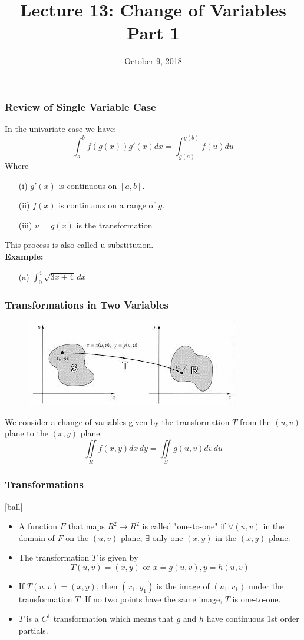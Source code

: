 \documentclass{beamer}
\title{Lecture 13: Change of Variables Part 1}
\date{October 9, 2018}
\begin{document}
	
\frame{\titlepage}


\begin{frame}
\frametitle{Review of Single Variable Case}
In the univariate case we have:
$$\int_a^b f(g(x))g'(x)dx = \int_{g(a)}^{g(b)} f(u) du$$
Where
\begin{itemize}
	\item[(i)] $g'(x)$ is continuous on $[a,b]$.
	\item[(ii)] $f(x)$ is continuous on a range of $g$.
	\item[(iii)] $u=g(x)$ is the transformation
\end{itemize}
This process is also called u-substitution.\\
\vspace{12pt}
\textbf{Example:}
\begin{itemize}
	\item[(a)] $\int_0^4 \sqrt{3x+4} \, dx$
\end{itemize}
\end{frame}

\begin{frame}
\frametitle{Transformations in Two Variables}
\begin{figure}
	
	\includegraphics[width=.9\textheight]{vmap.jpg}\\
	\hspace*{10pt}\hbox{}
\end{figure}
We consider a change of variables given by the transformation $T$ from the $(u,v)$ plane to the $(x,y)$ plane.
$$\iint\limits_R f(x,y) dx\,dy = \iint\limits_S g(u,v)dv\,du$$
\end{frame}


\begin{frame}
\frametitle{Transformations}
[ball]
\begin{itemize}
	\item A function $F$ that maps $\mathit{R}^2 \rightarrow \mathit{R}^2$ is called "one-to-one" if $\forall (u,v)$ in the domain of $F$ on the $(u,v)$ plane, $\exists$ only one $(x,y)$ in the $(x,y)$ plane.
	\item The transformation $T$ is given by $$T(u,v) = (x,y) \mbox{ or } x=g(u,v), y=h(u,v)$$
	\item If $T(u,v) = (x,y)$, then $(x_1,y_1)$ is the image of $(u_1,v_1)$ under the transformation $T$. If no two points have the same image, $T$ is one-to-one.
	\item $T$ is a $C^1$ transformation which means that $g$ and $h$ have continuous 1st order partials.
\end{itemize}
\end{frame}
\end{document}
